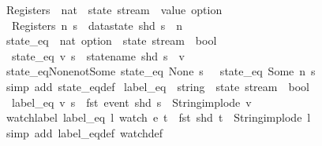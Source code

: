 \begin{isabellebody}
\isanewline
{}\isamarkupfalse%
\ Registers\ {\isacharcolon}{\isacharcolon}\ {\isachardoublequoteopen}nat\ {\isasymRightarrow}\ state\ stream\ {\isasymRightarrow}\ value\ option{\isachardoublequoteclose}\ \isanewline
\ \ {\isachardoublequoteopen}Registers\ n\ s\ {\isasymequiv}\ datastate\ {\isacharparenleft}shd\ s{\isacharparenright}\ {\isachardollar}\ n{\isachardoublequoteclose}\isanewline
\isanewline
{}\isamarkupfalse%
\ state_eq\ {\isacharcolon}{\isacharcolon}\ {\isachardoublequoteopen}nat\ option\ {\isasymRightarrow}\ state\ stream\ {\isasymRightarrow}\ bool{\isachardoublequoteclose}\ \isanewline
\ \ {\isachardoublequoteopen}state_eq\ v\ s\ {\isasymequiv}\ statename\ {\isacharparenleft}shd\ s{\isacharparenright}\ {\isacharequal}\ v{\isachardoublequoteclose}\isanewline
\isanewline
{}\isamarkupfalse%
\ state_eq{\isacharunderscore}None{\isacharunderscore}not{\isacharunderscore}Some{\isacharcolon}\ {\isachardoublequoteopen}state_eq\ None\ s\ {\isasymLongrightarrow}\ {\isasymnot}\ state_eq\ {\isacharparenleft}Some\ n{\isacharparenright}\ s{\isachardoublequoteclose}\isanewline
%
\isadelimproof
\ \ %
\endisadelimproof
%
\isatagproof
{}\isamarkupfalse%
\ {\isacharparenleft}simp\ add{\isacharcolon}\ state_eq{\isacharunderscore}def{\isacharparenright}%
\endisatagproof
{\isafoldproof}%
%
\isadelimproof
\isanewline
%
\endisadelimproof
\isanewline
{}\isamarkupfalse%
\ label_eq\ {\isacharcolon}{\isacharcolon}\ {\isachardoublequoteopen}string\ {\isasymRightarrow}\ state\ stream\ {\isasymRightarrow}\ bool{\isachardoublequoteclose}\ \isanewline
\ \ {\isachardoublequoteopen}label_eq\ v\ s\ {\isasymequiv}\ fst\ {\isacharparenleft}event\ {\isacharparenleft}shd\ s{\isacharparenright}{\isacharparenright}\ {\isacharequal}\ {\isacharparenleft}String{\isachardot}implode\ v{\isacharparenright}{\isachardoublequoteclose}\isanewline
\isanewline
{}\isamarkupfalse%
\ watch{\isacharunderscore}label{\isacharcolon}\ {\isachardoublequoteopen}label_eq\ l\ {\isacharparenleft}watch\ e\ t{\isacharparenright}\ {\isacharequal}\ {\isacharparenleft}fst\ {\isacharparenleft}shd\ t{\isacharparenright}\ {\isacharequal}\ String{\isachardot}implode\ l{\isacharparenright}{\isachardoublequoteclose}\isanewline
%
\isadelimproof
\ \ %
\endisadelimproof
%
\isatagproof
{}\isamarkupfalse%
\ {\isacharparenleft}simp\ add{\isacharcolon}\ label_eq{\isacharunderscore}def\ watch{\isacharunderscore}def{\isacharparenright}%
\endisatagproof
{\isafoldproof}%

\end{isabellebody}
